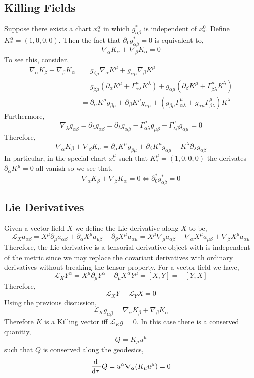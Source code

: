 \documentclass[11pt, a4paper]{article}
\begin{document}
\subsection{Killing Fields}

Suppose there exists a chart $x^\alpha_*$ in which $g_{\alpha \beta}^*$ is independent of $x^0_*$. Define $K^\alpha_* = (1, 0, 0, 0)$. Then the fact that $\partial_0 g_{\alpha \beta}^* = 0$ is equivalent to,
\[ \nabla_\alpha K_\alpha + \nabla_\beta K_\alpha = 0 \] 
To see this, consider,
\begin{align*}
\nabla_\alpha K_\beta + \nabla_\beta K_\alpha & = g_{\beta \mu} \nabla_\alpha K^\mu + g_{\alpha \mu} \nabla_\beta K^\mu 
\\
& = g_{\beta \mu} \left( \partial_\alpha K^\mu + \Gamma_{\alpha \lambda}^\mu K^\lambda \right) + g_{\alpha \mu} \left( \partial_\beta K^\mu + \Gamma^\mu_{\beta \lambda} K^\lambda \right)
\\
& = \partial_\alpha K^\mu g_{\beta \mu} + \partial_\beta K^\mu g_{\alpha \mu} + \left( g_{\beta \mu} \Gamma^\mu_{\alpha \lambda} + g_{\alpha \mu} \Gamma^\mu_{\beta \lambda} \right) K^\lambda
\end{align*}
Furthermore,
\[ \nabla_\lambda g_{\alpha \beta} = \partial_\lambda g_{\alpha \beta} = \partial_\lambda g_{\alpha \beta} - \Gamma^\mu_{\alpha \lambda} g_{\mu \beta} - \Gamma^\mu_{\lambda \beta} g_{\alpha \mu} = 0 \]
Therefore,
\[ \nabla_\alpha K_\beta + \nabla_\beta K_\alpha  = \partial_\alpha K^\mu g_{\beta \mu} + \partial_\beta K^\mu g_{\alpha \mu} +  K^\lambda \partial_\lambda g_{\alpha \beta} \]
In particular, in the special chart $x_*^\mu$ such that $K^\mu_* = (1, 0, 0, 0)$ the derivates $\partial_\alpha K^\mu = 0$ all vanish so we see that,
\[ \nabla_\alpha K_\beta + \nabla_{\beta} K_\alpha = 0 \iff \partial^*_0 g_{\alpha \beta}^* = 0 \]

\subsection{Lie Derivatives}

\newcommand{\Lie}[1]{\mathcal{L}_{#1}}

Given a vector field $X$ we define the Lie derivative along $X$ to be,
\[ \Lie{X} a_{\alpha \beta} = X^\mu \partial_\mu a_{\alpha \beta} + \partial_\alpha X^\mu a_{\mu \beta} + \partial_\beta X^\mu a_{\alpha \mu} = X^\mu \nabla_\mu a_{\alpha \beta} + \nabla_\alpha X^\mu a_{\mu \beta} + \nabla_\beta X^\mu a_{\alpha \mu} \]
Therefore, the Lie derivative is a tensorial derivative object with is independent of the metric since we may replace the covariant derivatives with ordinary derivatives without breaking the tensor property. For a vector field we have,
\[ \Lie{X} Y^\alpha = X^\mu \partial_\mu Y^\alpha - \partial_\mu X^\alpha Y^\mu = [X, Y] = - [Y, X] \]
Therefore, 
\[ \Lie{X} Y + \Lie{Y} X = 0 \]
Using the previous discussion,
\[ \Lie{K} g_{\alpha \beta} = \nabla_\alpha K_\beta + \nabla_\beta K_\alpha \]
Therefore $K$ is a Killing vector iff $\Lie{K} g = 0$. In this case there is a conserved quanitiy,
\[ Q = K_\mu u^\mu \]
such that $Q$ is conserved along the geodesics,
\[ \frac{\mathrm{d} \:}{\mathrm{d}\tau \:} Q = u^\alpha \nabla_\alpha (K_\mu u^\mu) = 0 \]
\end{document}

